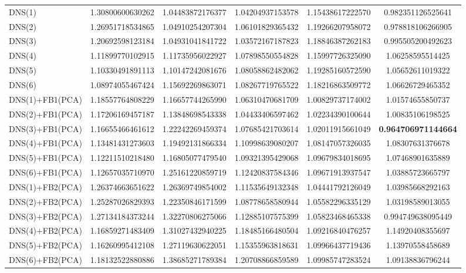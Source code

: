 \begin{table}[H]
\begin{adjustbox}{totalheight=\baselineskip}
\begin{tabular}{lSSSSS}
DNS(1) & 1.30800600630262 & 1.04483872176377 & 1.04204937153578 & 1.15438617222570 & 0.982351126525641 \\ 
DNS(2) & 1.26951718534865 & 1.04910254207304 & 1.06101829365432 & 1.19266207958072 & 0.978818106266905 \\ 
DNS(3) & 1.20692598123184 & 1.04931041841722 & 1.03572167187823 & 1.18846387262183 & 0.995505200492623 \\ 
DNS(4) & 1.11899770102915 & 1.11735956022927 & 1.07898550554828 & 1.15997726325090 & 1.06258595514425 \\ 
DNS(5) & 1.10330491891113 & 1.10147242081676 & 1.08058862482062 & 1.19285160572590 & 1.05652611019322 \\ 
DNS(6) & 1.08974055467424 & 1.15692269863071 & 1.08267719765522 & 1.18216863509772 & 1.06626729465352 \\ 
DNS(1)+FB1(PCA) & 1.18557764808229 & 1.16657744265990 & 1.06310470681709 & 1.00829737174002 & 1.01574655850737 \\ 
DNS(2)+FB1(PCA) & 1.17206169457187 & 1.13848698543338 & 1.04433406597462 & 1.02234390100644 & 1.00835106198525 \\ 
DNS(3)+FB1(PCA) & 1.16655466461612 & 1.22242269459374 & 1.07685421703614 & 1.02011915661049 & \bfseries 0.964706971144664 \\ 
DNS(4)+FB1(PCA) & 1.13481431273603 & 1.19492131866334 & 1.10998639080207 & 1.08147057326035 & 1.08307631376678 \\ 
DNS(5)+FB1(PCA) & 1.12211510218480 & 1.16805077479540 & 1.09321395429068 & 1.09679834018695 & 1.07468901635889 \\ 
DNS(6)+FB1(PCA) & 1.12657035710970 & 1.25161220859719 & 1.12420837584346 & 1.09671913937547 & 1.03885723665797 \\ 
DNS(1)+FB2(PCA) & 1.26374663651622 & 1.26369749854002 & 1.11535649132348 & 1.04441792126049 & 1.03985668292163 \\ 
DNS(2)+FB2(PCA) & 1.25287026829393 & 1.22350846171599 & 1.08778658580944 & 1.05582296335129 & 1.03198589013055 \\ 
DNS(3)+FB2(PCA) & 1.27134184373244 & 1.32270806275066 & 1.12885107575399 & 1.05823468465338 & 0.994749638095449 \\ 
DNS(4)+FB2(PCA) & 1.16859271483409 & 1.31027432940225 & 1.18485166480504 & 1.09216840476257 & 1.14920408355697 \\ 
DNS(5)+FB2(PCA) & 1.16260995412108 & 1.27119630622051 & 1.15355963818631 & 1.09966437719436 & 1.13970558458689 \\ 
DNS(6)+FB2(PCA) & 1.18132522880886 & 1.38685271789384 & 1.20708866859589 & 1.09985747283524 & 1.09138836796244 \\ 

\end{tabular}
\end{adjustbox}
\end{table}
